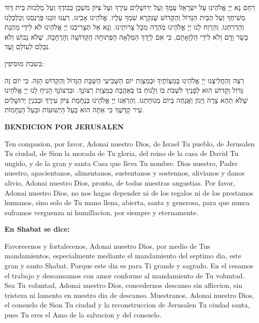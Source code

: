 \documentclass[12pt,twoside]{article}
\newcommand{\HebrewText}[1]{%
  \selectlanguage{hebrew}%
  \begin{RTL}%
    \noindent\Large #1%
  \end{RTL}%
}
\newcommand{\EnglishContent}{}
\newcommand{\SpanishContent}{}
\newenvironment{TriLingualStanza}{%
  \clearpage
  \ifbool{firststanza}{}{%
    \cleardoublepage
  }%
  \setbool{firststanza}{false}
}{%
  \clearpage
  \setlength{\columnsep}{1.2cm}
  \begin{paracol}{2}
    \begin{leftcolumn}
      \selectlanguage{english}%
      \normalsize%
      \noindent%
      \vspace*{0pt}%
      \EnglishContent
    \end{leftcolumn}
    \switchcolumn
    \begin{rightcolumn}
      \selectlanguage{spanish}%
      \normalsize%
      \noindent%
      \vspace*{0pt}%
      \SpanishContent
    \end{rightcolumn}
  \end{paracol}
  \vspace{2em}%
}
\begin{document}
\renewcommand{\SpanishContent}{%
\begin{minipage}[t]{\linewidth}
\textbf{BENDICION POR JERUSALEN}\par\vspace{0.5em}
\small{Ten compasion, por favor, Adonai nuestro Dios,  
de Israel Tu pueblo,  
de Jerusalen Tu ciudad,  
de Sion la morada de Tu gloria,  
del reino de la casa de David Tu ungido,  
y de la gran y santa Casa que lleva Tu nombre.  
Dios nuestro, Padre nuestro,  
apacientanos, alimentanos, sustentanos y sostennos,  
alivianos y danos alivio, Adonai nuestro Dios, pronto, de todas nuestras angustias.  
Por favor, Adonai nuestro Dios, no nos hagas depender  
ni de los regalos ni de los prestamos humanos,  
sino solo de Tu mano llena, abierta, santa y generosa,  
para que nunca suframos verguenza ni humillacion,  
por siempre y eternamente.}\par\vspace{1em}
\footnotesize{\textbf{En Shabat se dice:}}\par\vspace{0.5em}
\small{Favorecenos y fortalecenos, Adonai nuestro Dios,  
por medio de Tus mandamientos,  
especialmente mediante el mandamiento del septimo dia,  
este gran y santo Shabat.  
Porque este dia es para Ti grande y sagrado.  
En el cesamos el trabajo y descansamos con amor  
conforme al mandamiento de Tu voluntad.  
Sea Tu voluntad, Adonai nuestro Dios,  
concedernos descanso sin afliccion,  
sin tristeza ni lamento en nuestro dia de descanso.  
Muestranos, Adonai nuestro Dios, el consuelo de Sion Tu ciudad  
y la reconstruccion de Jerusalen Tu ciudad santa,  
pues Tu eres el Amo de la salvacion y del consuelo.}
\end{minipage}
}

\begin{TriLingualStanza}
\HebrewText{%
\begin{minipage}[t]{\linewidth}
רַחֵם נָא יְיָ אֱלֹהֵינוּ עַל יִשְׂרָאֵל עַמֶּךָ וְעַל יְרוּשָׁלַיִם עִירֶךָ וְעַל צִיּוֹן מִשְׁכַּן כְּבוֹדֶךָ וְעַל מַלְכוּת בֵּית דָּוִד מְשִׁיחֶךָ וְעַל הַבַּיִת הַגָּדוֹל וְהַקָּדוֹשׁ שֶׁנִּקְרָא שִׁמְךָ עָלָיו. אֱלֹהֵינוּ אָבִינוּ, רְעֵנוּ זוּנֵנוּ פַּרְנְסֵנוּ וְכַלְכְּלֵנוּ וְהַרְוִיחֵנוּ, וְהַרְוַח לָנוּ יְיָ אֱלֹהֵינוּ מְהֵרָה מִכָּל צָרוֹתֵינוּ. וְנָא אַל תַּצְרִיכֵנוּ יְיָ אֱלֹהֵינוּ לֹא לִידֵי מַתְּנַת בָּשָׂר וָדָם וְלֹא לִידֵי הַלְוָאָתָם, כִּי אִם לְיָדְךָ הַמְּלֵאָה הַפְּתוּחָה הַקְּדוֹשָׁה וְהָרְחָבָה, שֶׁלֹּא נֵבוֹשׁ וְלֹא נִכָּלֵם לְעוֹלָם וָעֶד.\par\vspace{1em}
בשבת מוסיפין:\par
רְצֵה וְהַחֲלִיצֵנוּ יְיָ אֱלֹהֵינוּ בְּמִצְוֹתֶיךָ וּבְמִצְוַת יוֹם הַשְּׁבִיעִי הַשַּׁבָּת הַגָּדוֹל וְהַקָּדוֹשׁ הַזֶּה. כִּי יוֹם זֶה גָּדוֹל וְקָדוֹשׁ הוּא לְפָנֶיךָ לִשְׁבֹּת בּוֹ וְלָנוּחַ בּוֹ בְּאַהֲבָה כְּמִצְוַת רְצוֹנֶךָ. וּבִרְצוֹנְךָ הָנִיחַ לָנוּ יְיָ אֱלֹהֵינוּ שֶׁלֹּא תְהֵא צָרָה וְיָגוֹן וַאֲנָחָה בְּיוֹם מְנוּחָתֵנוּ. וְהַרְאֵנוּ יְיָ אֱלֹהֵינוּ בְּנֶחָמַת צִיּוֹן עִירֶךָ וּבְבִנְיַן יְרוּשָׁלַיִם עִיר קָדְשֶׁךָ כִּי אַתָּה הוּא בַּעַל הַיְשׁוּעוֹת וּבַּעַל הַנֶּחָמוֹת.
\end{minipage}
}
\end{TriLingualStanza}
\end{document}
